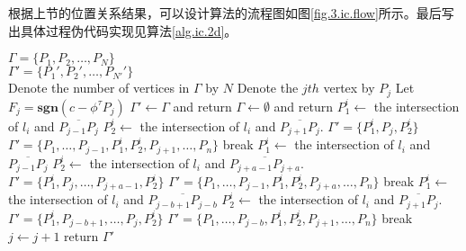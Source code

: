 根据上节的位置关系结果，可以设计算法的流程图如图\ref{fig.3.ic.flow}所示。最后写出具体过程伪代码实现见算法\ref{alg.ic.2d}。
\begin{algo}%
\caption{$\mathbf{AddLinear2D}$}
\label{alg.ic.2d}
\begin{algorithmic}
\REQUIRE $\Gamma=\{P_{1},P_{2},\ldots,P_{N}\}$\\
\ENSURE $\Gamma'=\{P_{1}',P_{2}',\ldots,P_{N'}'\}$\\
\STATE Denote the number of vertices in $\Gamma$ by $N$
	\STATE Denote the $jth$ vertex by $P_{j}$
	\STATE Let $F_{j}=\mathbf{sgn}(c-\phi^{\tau}P_{j})$
\ENDFOR
{}
	\STATE $\Gamma'\leftarrow\Gamma$ and return
	\STATE $\Gamma\leftarrow\emptyset$ and return
\ENDIF
{}
		\STATE $P_{1}^{i}\leftarrow$ the intersection of $l_{i}$ and $\overline{P_{j-1}P_{j}}$
		\STATE $P_{2}^{i}\leftarrow$ the intersection of $l_{i}$ and $\overline{P_{j+1}P_{j}}$.
			\STATE$\Gamma'=\{P_{1}^{i},P_{j},P_{2}^{i}\}$
		\ELSE
			\STATE$\Gamma'=\{P_{1},\ldots,P_{j-1},P_{1}^{i},P_{2}^{i},P_{j+1},\ldots,P_{n}\}$
		\ENDIF
        \STATE break
		\STATE $P_{1}^{i}\leftarrow$ the intersection of $l_{i}$ and $\overline{P_{j-1}P_{j}}$
		\STATE $P_{2}^{i}\leftarrow$ the intersection of $l_{i}$ and $\overline{P_{j+a-1}P_{j+a}}$.
			\STATE$\Gamma'=\{P_{1}^{i},P_{j},\ldots,P_{j+a-1},P_{2}^{i}\}$
		\ELSE
			\STATE$\Gamma'=\{P_{1},\ldots,P_{j-1},P_{1}^{i},P_{2}^{i},P_{j+a},\ldots,P_{n}\}$
		\ENDIF
        \STATE break
		\STATE $P_{1}^{i}\leftarrow$ the intersection of $l_{i}$ and $\overline{P_{j-b+1}P_{j-b}}$
		\STATE $P_{2}^{i}\leftarrow$ the intersection of $l_{i}$ and $\overline{P_{j+1}P_{j}}$.
			\STATE$\Gamma'=\{P_{1}^{i},P_{j-b+1},\ldots,P_{j},P_{2}^{i}\}$
		\ELSE
			\STATE$\Gamma'=\{P_{1},\ldots,P_{j-b},P_{1}^{i},P_{2}^{i},P_{j+1},\ldots,P_{n}\}$
		\ENDIF
        \STATE break
    \ENDIF
	\STATE $j\leftarrow j+1$
\ENDFOR
\STATE return $\Gamma'$
\end{algorithmic}
\end{algo}

